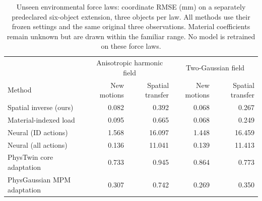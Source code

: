 \begin{table}[t]
\centering\small
\begin{tabular}{lrrrr}
\toprule
& \multicolumn{2}{c}{Anisotropic harmonic field} & \multicolumn{2}{c}{Two-Gaussian field} \\
Method & New motions & Spatial transfer & New motions & Spatial transfer \\
\midrule
Spatial inverse (ours) & 0.082 & 0.392 & 0.068 & 0.267 \\
Material-indexed load & 0.095 & 0.665 & 0.068 & 0.249 \\
Neural (ID actions) & 1.568 & 16.097 & 1.448 & 16.459 \\
Neural (all actions) & 0.136 & 11.041 & 0.139 & 11.413 \\
PhysTwin core adaptation & 0.733 & 0.945 & 0.864 & 0.773 \\
PhysGaussian MPM adaptation & 0.307 & 0.742 & 0.269 & 0.350 \\
\bottomrule
\end{tabular}
\caption{Unseen environmental force laws: coordinate RMSE (mm) on a separately predeclared six-object extension, three objects per law. All methods use their frozen settings and the same original three observations. Material coefficients remain unknown but are drawn within the familiar range. No model is retrained on these force laws.}
\label{tab:force-law}
\end{table}
